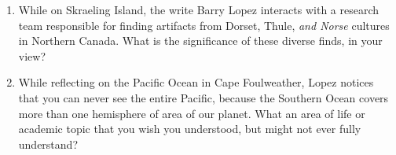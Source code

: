 \documentclass[10pt]{article}
\begin{document}
\begin{enumerate}
\item While on Skraeling Island, the write Barry Lopez interacts with a research team responsible for finding artifacts from Dorset, Thule, \textit{and Norse} cultures in Northern Canada.  What is the significance of these diverse finds, in your view? \\ \vspace{5cm}
\item While reflecting on the Pacific Ocean in Cape Foulweather, Lopez notices that you can never see the entire Pacific, because the Southern Ocean covers more than one hemisphere of area of our planet.  What an area of life or academic topic that you wish you understood, but might not ever fully understand? \\ \vspace{5cm}
\end{enumerate}
\end{document}

